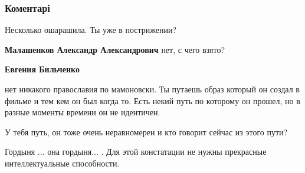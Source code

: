 
 
 
 
 
\subsubsection{Коментарі}
\label{sec:06_08_2021.fb.bilchenko_evgenia.3.pravoslavie_po_mamonovski.cmt}

\begin{itemize}
 
Несколько ошарашила. Ты уже в пострижении?

\begin{itemize}
 
\textbf{Малашенков Александр Александрович} нет, с чего взято?

 
\textbf{Евгения Бильченко} 

нет никакого православия по мамоновски. Ты путаешь образ который он создал в
фильме и тем кем он был когда то. Есть некий путь по которому он прошел, но в
разные моменты времени он не идентичен.

У тебя путь, он тоже очень неравномерен и кто говорит сейчас из этого пути?

Гордыня ... она гордыня... . Для этой констатации не нужны прекрасные
интеллектуальные способности.

 

\end{itemize}
\end{itemize}
